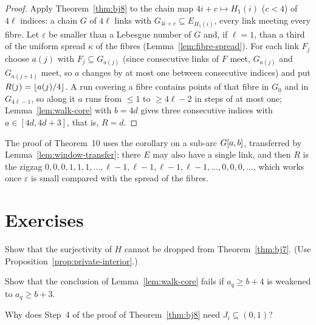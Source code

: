 \begin{proof}
Apply Theorem~\ref{thm:bj8} to the chain map $4i+c\mapsto H_1(i)$ ($c<4$) of $4\ell$ indices: a chain $G$ of $4\ell$ links with $G_{4i+c}\subseteq E_{H_1(i)}$, every link
meeting every fibre. Let $\varepsilon$ be smaller than a Lebesgue number of $G$ and, if $\ell=1$, than a third of the uniform spread $\kappa$ of the fibres
(Lemma~\ref{lem:fibre-spread}). For each link $F_j$ choose $a(j)$ with $F_j\subseteq G_{a(j)}$ (since consecutive links of $F$ meet, $G_{a(j)}$ and $G_{a(j+1)}$ meet, so $a$ changes by at most one
between consecutive indices) and put $R(j)=\left\lfloor a(j)/4\right\rfloor$. A run covering a fibre contains points of that fibre in $G_0$ and in
$G_{4\ell-1}$, so along it $a$ runs from $\le1$ to $\ge4\ell-2$ in steps of at most one; Lemma~\ref{lem:walk-core} with $b=4d$ gives three consecutive indices with
$a\in[4d,4d+3]$, that is, $R=d$.
\end{proof}


The proof of Theorem~10 uses the corollary on a sub-arc $G[a,b]$, transferred by Lemma~\ref{lem:window-transfer}; there $E$ may also have a single link, and then $R$ is the
zigzag $0,0,0,1,1,1,\dots,\ell-1,\ell-1,\ell-1,\ell-1,\dots,0,0,0,\dots$, which works once $\varepsilon$ is small compared with the spread of the fibres.


\section*{Exercises}

\begin{exercise}
Show that the surjectivity of $H$ cannot be dropped from Theorem~\ref{thm:bj7}. (Use Proposition~\ref{prop:private-interior}.)
\end{exercise}

\begin{exercise}
Show that the conclusion of Lemma~\ref{lem:walk-core} fails if $a_q\ge b+4$ is weakened to $a_q\ge b+3$.
\end{exercise}

\begin{exercise}
Why does Step~4 of the proof of Theorem~\ref{thm:bj8} need $J_i\subseteq(0,1)$?
\end{exercise}
